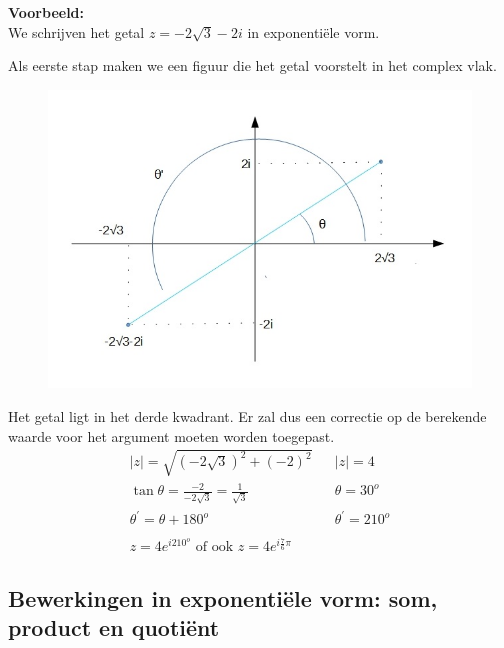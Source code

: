 {\bf Voorbeeld:} \\

We schrijven het getal $z=-2\sqrt{3}-2i$ in exponenti\"{e}le vorm.\\

\vspace{0.3cm}

Als eerste stap maken we een figuur die het getal voorstelt in het complex vlak.\\

\begin{figure}[h]
	\begin{center}
		\includegraphics[scale=0.5]{3_gonio_complexe_getallen/inputs/complex-getal-voorbeeld4.jpg}
	\end{center}
\end{figure}

Het getal ligt in het derde kwadrant. Er zal dus een correctie op de berekende waarde voor het argument moeten worden toegepast.\\

\[ \begin{array}{lll}
	|z|=\sqrt{(-2\sqrt{3})^2 +(-2)^2} & & |z|=4 \\
	\tan \theta = \frac{-2}{-2\sqrt{3}}=\frac{1}{\sqrt{3}} & & \theta = 30^{o}\\
	\theta^{'}=\theta+180^{o} & & \theta^{'}=210^{o} \\
	&  &          \\
	z=4e^{i210^{o}} \text{ of ook } z=4e^{i\frac{7}{6}\pi}  &  & 
\end{array} \]

\subsection{Bewerkingen in exponenti\"{e}le vorm: som, product en quoti\"{e}nt} 

